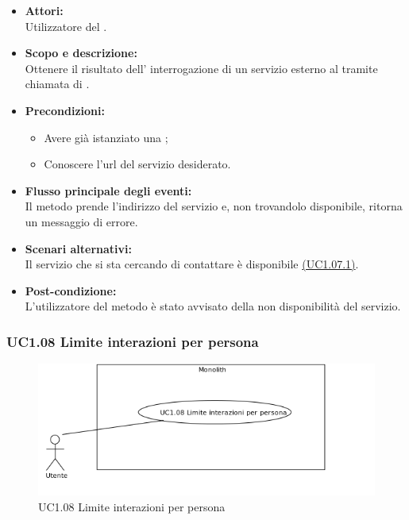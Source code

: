 \begin{itemize}
	\item \textbf{Attori:}
	\\Utilizzatore del .
	\item \textbf{Scopo e descrizione:} 
	\\Ottenere il risultato dell’ interrogazione di un servizio esterno al  tramite chiamata di .
	\item \textbf{Precondizioni:}
	\begin{itemize}
		\item Avere già istanziato una ;
		\item Conoscere l'url del servizio desiderato.
	\end{itemize}
	\item \textbf{Flusso principale degli eventi:}
	\\Il metodo prende l'indirizzo del servizio e, non trovandolo disponibile, ritorna un messaggio di errore.
	\item \textbf{Scenari alternativi:}
	\\Il servizio che si sta cercando di contattare è disponibile \hyperref[UC1.07.1]{(UC1.07.1)}.
	\item \textbf{Post-condizione:}
	\\L’utilizzatore del metodo è stato avvisato della non disponibilità del servizio.
\end{itemize}

\subsubsection{UC1.08 Limite interazioni per persona} \label{UC1.08}

\begin{figure}[H]
	\centering
	\includegraphics[width=15cm]{../../documenti/AnalisiDeiRequisiti/Diagrammi_img/uc1_08.png}
	\caption{UC1.08 Limite interazioni per persona}
\end{figure}

